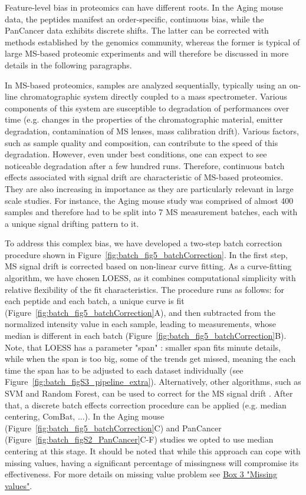 \documentclass[num-refs]{wiley-article}
\begin{document}
Feature-level bias in proteomics can have different  roots. In the Aging mouse data, the peptides manifest an order-specific, continuous bias, while the PanCancer data exhibits discrete shifts. The latter can be corrected with methods established by the genomics community, whereas the former is typical of large MS-based proteomic experiments and will therefore be discussed in more details in the following paragraphs.

In MS-based proteomics, samples are analyzed sequentially, typically using an on-line chromatographic system directly coupled to a mass spectrometer. Various components of this system are susceptible to degradation of performances over time (e.g. changes in the properties of the chromatographic material, emitter degradation, contamination of MS lenses, mass calibration drift). Various factors, such as sample quality and composition, can contribute to the speed of this degradation. However, even under best conditions, one can expect to see noticeable degradation after a few hundred runs. Therefore, continuous batch effects associated with signal drift are characteristic of MS-based proteomics. They are also increasing in importance as they are particularly relevant in large scale studies. For instance, the Aging mouse study was comprised of almost 400 samples and therefore had to be split into 7 MS measurement batches, each with a unique signal drifting pattern to it.

To address this complex bias, we have developed a two-step batch correction procedure shown in Figure~\ref{fig:batch_fig5_batchCorrection}. In the first step, MS signal drift is corrected based on non-linear curve fitting. As a curve-fitting algorithm, we have chosen LOESS, as it combines computational simplicity with relative flexibility of the fit characteristics. The procedure runs as follows: for each peptide and each batch, a unique curve is fit (Figure~\ref{fig:batch_fig5_batchCorrection}A), and then subtracted from the normalized intensity value in each sample, leading to measurements, whose median is different in each batch (Figure~\ref{fig:batch_fig5_batchCorrection}B). Note, that LOESS has a parameter "span" : smaller span fits minute details, while when the span is too big, some of the trends get missed, meaning the each time the span has to be adjusted to each dataset individually (see Figure~\ref{fig:batch_figS3_pipeline_extra}). Alternatively, other algorithms, such as SVM and Random Forest, can be used to correct for the MS signal drift \cite{Luan2018, Shen2016}.   After that, a discrete batch effects correction procedure can be applied (e.g. median centering, ComBat, ...). In the Aging mouse (Figure~\ref{fig:batch_fig5_batchCorrection}C) and PanCancer (Figure~\ref{fig:batch_figS2_PanCancer}C-F) studies we opted to use median centering at this stage. It should be noted that while this approach can cope with missing values, having a significant percentage of missingness will compromise its effectiveness. For more details on missing value problem see \hyperref[box:Box3_missingness]{Box 3 "Missing values"}.
\end{document}
